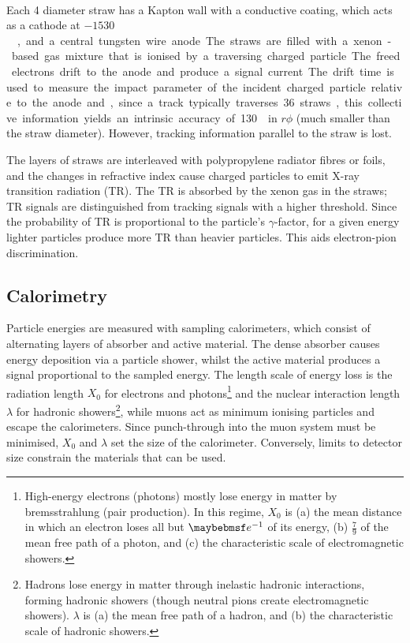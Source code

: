 \begin{description}
	Each \unit{4}{\milli\metre} diameter straw has a 
	Kapton\textsuperscript{\circledR}\xspace wall with a conductive coating, which 
	acts as a cathode at \unit{$-1530$}{\volt}, and a central tungsten wire anode. The 
	straws are filled with a xenon-based gas mixture that is ionised by a traversing 
	charged particle. The freed electrons drift to the anode and produce a signal current.
	The drift time is used to measure the impact parameter of the incident charged 
	particle relative to the anode and, since a track typically traverses 36 straws, this 
	collective information yields an intrinsic accuracy of \unit{130}{\micro\metre} in 
	$r\phi$ (much smaller than the straw diameter). However, tracking information 
	parallel to the straw is lost.

	The layers of straws are interleaved with polypropylene radiator fibres or foils, and 
	the changes in refractive index cause charged particles to emit X-ray transition 
	radiation (TR). The TR is absorbed by the xenon gas in the straws; TR signals are 
	distinguished from tracking signals with a higher threshold. Since the probability of 
	TR is proportional to the particle's $\gamma$-factor, for a given energy lighter 
	particles produce more TR than heavier particles. This aids electron-pion 
	discrimination.
\end{description}

\subsection{Calorimetry}

Particle energies are measured with sampling calorimeters, which consist of alternating 
layers of absorber and active material. The dense absorber causes energy deposition 
via a particle shower, whilst the active material produces a signal proportional to the 
sampled energy. The length scale of energy loss is the radiation length $X_0$ for 
electrons and photons\footnote{
	High-energy electrons (photons) mostly lose energy in matter by bremsstrahlung 
	(\epluseminus pair production). In this regime, $X_0$ is (a) the mean distance in 
	which an electron loses all but $\eexp{-1}$ of its energy, (b) $\tfrac{7}{9}$ of the 
	mean free path of a photon, and (c) the characteristic scale of electromagnetic 
	showers.
} and the nuclear interaction length $\lambda$ for hadronic showers\footnote{
	Hadrons lose energy in matter through inelastic hadronic interactions, forming hadronic showers (though neutral pions create electromagnetic showers). $\lambda$ is 
	(a) the mean free path of a hadron, and (b) the characteristic scale of hadronic showers.
}, while muons act as minimum ionising particles and escape the calorimeters. Since 
punch-through into the muon system must be minimised, $X_0$ and $\lambda$ set the size of 
the calorimeter. Conversely, limits to detector size constrain the materials that can be
used.

